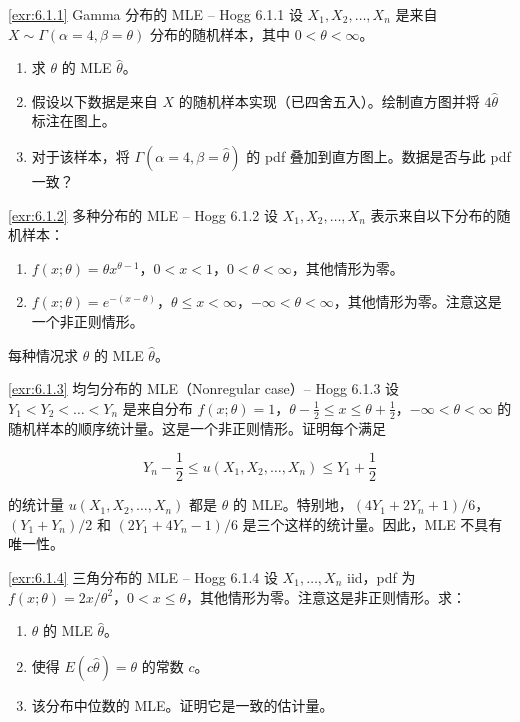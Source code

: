 
\begin{exercise}{\ref{exr:6.1.1} Gamma 分布的 MLE – Hogg 6.1.1}\label{exr:6.1.1}
设 $X_1, X_2, \ldots, X_n$ 是来自 $X \sim \Gamma(\alpha=4, \beta=\theta)$ 分布的随机样本，其中 $0 < \theta < \infty$。

\begin{enumerate}
\item 求 $\theta$ 的 MLE $\widehat{\theta}$。
\item 假设以下数据是来自 $X$ 的随机样本实现（已四舍五入）。绘制直方图并将 $4\widehat{\theta}$ 标注在图上。
\item 对于该样本，将 $\Gamma(\alpha=4, \beta=\widehat{\theta})$ 的 pdf 叠加到直方图上。数据是否与此 pdf 一致？
\end{enumerate}
\end{exercise}

\begin{exercise}{\ref{exr:6.1.2} 多种分布的 MLE – Hogg 6.1.2}\label{exr:6.1.2}
设 $X_1, X_2, \ldots, X_n$ 表示来自以下分布的随机样本：

\begin{enumerate}
\item[(a)] $f(x;\theta) = \theta x^{\theta-1}$，$0 < x < 1$，$0 < \theta < \infty$，其他情形为零。
\item[(b)] $f(x;\theta) = e^{-(x-\theta)}$，$\theta \leq x < \infty$，$-\infty < \theta < \infty$，其他情形为零。注意这是一个非正则情形。
\end{enumerate}

每种情况求 $\theta$ 的 MLE $\widehat{\theta}$。
\end{exercise}

\begin{exercise}{\ref{exr:6.1.3} 均匀分布的 MLE（Nonregular case）– Hogg 6.1.3}\label{exr:6.1.3}
设 $Y_1 < Y_2 < \ldots < Y_n$ 是来自分布 $f(x;\theta) = 1$，$\theta - \frac{1}{2} \leq x \leq \theta + \frac{1}{2}$，$-\infty < \theta < \infty$ 的随机样本的顺序统计量。这是一个非正则情形。证明每个满足

\[
Y_n - \frac{1}{2} \leq u(X_1, X_2, \ldots, X_n) \leq Y_1 + \frac{1}{2}
\]

的统计量 $u(X_1, X_2, \ldots, X_n)$ 都是 $\theta$ 的 MLE。特别地，$(4Y_1 + 2Y_n + 1)/6$，$(Y_1 + Y_n)/2$ 和 $(2Y_1 + 4Y_n - 1)/6$ 是三个这样的统计量。因此，MLE 不具有唯一性。
\end{exercise}

\begin{exercise}{\ref{exr:6.1.4} 三角分布的 MLE – Hogg 6.1.4}\label{exr:6.1.4}
设 $X_1, \ldots, X_n$ iid，pdf 为 $f(x;\theta) = 2x/\theta^2$，$0 < x \leq \theta$，其他情形为零。注意这是非正则情形。求：

\begin{enumerate}
\item[(a)] $\theta$ 的 MLE $\widehat{\theta}$。
\item[(b)] 使得 $E(c\widehat{\theta}) = \theta$ 的常数 $c$。
\item[(c)] 该分布中位数的 MLE。证明它是一致的估计量。
\end{enumerate}
\end{exercise}

